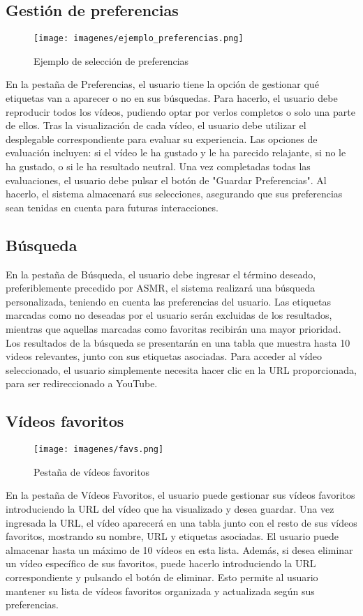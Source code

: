 \documentclass[a4paper,12pt,twoside]{memoir}
\begin{document}
 \subsection{Gestión de preferencias}
 \begin{figure}
        \centering
        \texttt{[image: imagenes/ejemplo\_preferencias.png]} 
        \caption{Ejemplo de selección de preferencias}
        \label{fig:ejemplo}
    \end{figure}
En la pestaña de Preferencias, el usuario tiene la opción de gestionar qué etiquetas van a aparecer o no en sus búsquedas. Para hacerlo, el usuario debe reproducir todos los vídeos, pudiendo optar por verlos completos o solo una parte de ellos. Tras la visualización de cada vídeo, el usuario debe utilizar el desplegable correspondiente para evaluar su experiencia. Las opciones de evaluación incluyen: si el vídeo le ha gustado y le ha parecido relajante, si no le ha gustado, o si le ha resultado neutral. Una vez completadas todas las evaluaciones, el usuario debe pulsar el botón de "Guardar Preferencias". Al hacerlo, el sistema almacenará sus selecciones, asegurando que sus preferencias sean tenidas en cuenta para futuras interacciones.
 \subsection{Búsqueda}

 En la pestaña de Búsqueda, el usuario debe ingresar el término deseado, preferiblemente precedido por ASMR, el sistema realizará una búsqueda personalizada, teniendo en cuenta las preferencias del usuario. Las etiquetas marcadas como no deseadas por el usuario serán excluidas de los resultados, mientras que aquellas marcadas como favoritas recibirán una mayor prioridad. Los resultados de la búsqueda se presentarán en una tabla que muestra hasta 10 videos relevantes, junto con sus etiquetas asociadas. Para acceder al vídeo seleccionado, el usuario simplemente necesita hacer clic en la URL proporcionada, para ser redireccionado a YouTube.

 \subsection{Vídeos favoritos}
 \begin{figure}
        \centering
        \texttt{[image: imagenes/favs.png]} 
        \caption{Pestaña de vídeos favoritos}
        \label{fig:ejemplo}
    \end{figure}
 En la pestaña de Vídeos Favoritos, el usuario puede gestionar sus vídeos favoritos introduciendo la URL del vídeo que ha visualizado y desea guardar. Una vez ingresada la URL, el vídeo aparecerá en una tabla junto con el resto de sus vídeos favoritos, mostrando su nombre, URL y etiquetas asociadas. El usuario puede almacenar hasta un máximo de 10 vídeos en esta lista. Además, si desea eliminar un vídeo específico de sus favoritos, puede hacerlo introduciendo la URL correspondiente y pulsando el botón de eliminar. Esto permite al usuario mantener su lista de vídeos favoritos organizada y actualizada según sus preferencias.
\end{document}
